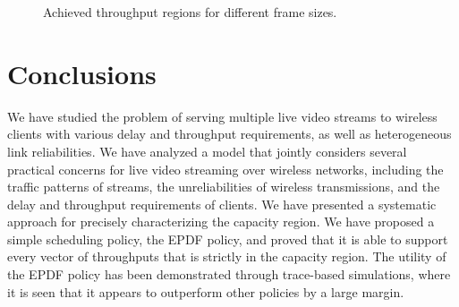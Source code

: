 \documentclass[10pt,nocopyrightspace]{sigplan-proc-varsize-1in}
\begin{document}
\begin{figure*}[t]
\hspace{0.01\linewidth} 
\hspace{0.01\linewidth} 
\caption{Achieved throughput regions for different frame sizes.}\label{fig:simulation:short}
\end{figure*}

\section{Conclusions}	\label{section:conclusions}

We have studied the problem of serving multiple live video streams to wireless clients with various delay and throughput requirements, as well as heterogeneous link reliabilities. We have analyzed a model that jointly considers several practical concerns for live video streaming over wireless networks, including the traffic patterns of streams, the unreliabilities of wireless transmissions, and the delay and throughput requirements of clients. We have presented a systematic approach for precisely characterizing the capacity region. We have proposed a simple scheduling policy, the EPDF policy, and proved that it is able to support every vector of throughputs that is strictly in the capacity region. The utility of the EPDF policy has been demonstrated through trace-based simulations, where it is seen that it appears to outperform other policies by a large margin.
 



\end{document}
